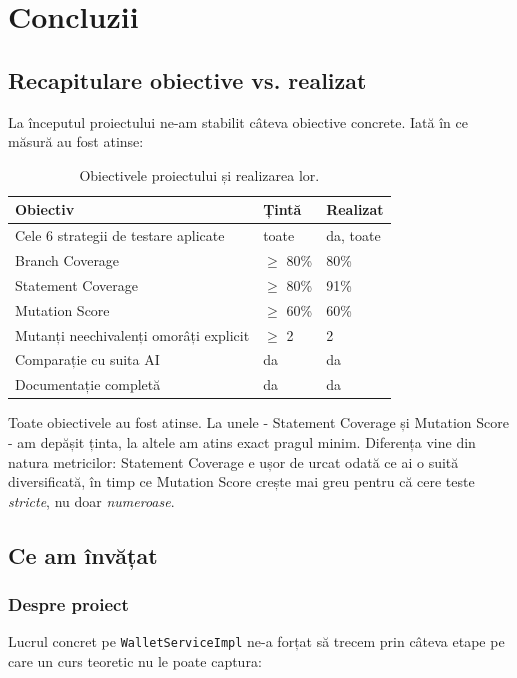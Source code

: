 \chapter{Concluzii}
\label{ch:concluzii}

\section{Recapitulare obiective vs. realizat}

La începutul proiectului ne-am stabilit câteva obiective concrete. Iată în ce măsură au fost atinse:

\begin{table}[!htb]
\centering
\caption{Obiectivele proiectului și realizarea lor.}
\label{tab:objectives}
\begin{tabularx}{\linewidth}{Xll}
\toprule
\textbf{Obiectiv} & \textbf{Țintă} & \textbf{Realizat} \\
\midrule
Cele 6 strategii de testare aplicate & toate & da, toate \\
Branch Coverage & $\geq$ 80\% & 80\% \\
Statement Coverage & $\geq$ 80\% & 91\% \\
Mutation Score & $\geq$ 60\% & 60\% \\
Mutanți neechivalenți omorâți explicit & $\geq$ 2 & 2 \\
Comparație cu suita AI & da & da \\
Documentație completă & da & da \\
\bottomrule
\end{tabularx}
\end{table}

Toate obiectivele au fost atinse. La unele - Statement Coverage și Mutation Score - am depășit ținta, la altele am atins exact pragul minim. Diferența vine din natura metricilor: Statement Coverage e ușor de urcat odată ce ai o suită diversificată, în timp ce Mutation Score crește mai greu pentru că cere teste \textit{stricte}, nu doar \textit{numeroase}.

\section{Ce am învățat}

\subsection{Despre proiect}

Lucrul concret pe \texttt{WalletServiceImpl} ne-a forțat să trecem prin câteva etape pe care un curs teoretic nu le poate captura:


